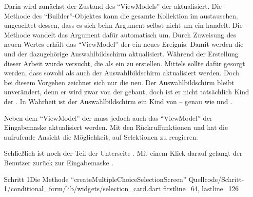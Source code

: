 Darin wird zunächst der Zustand des \enquote{ViewModels} der  aktualisiert.
Die -Methode des \enquote{Builder}-Objektes kann die gesamte Kollektion im  austauschen, ungeachtet dessen, dass es sich beim Argument selbst nicht um ein  handelt.
Die -Methode wandelt das Argument dafür automatisch um.
Durch Zuweisung des neuen Wertes erhält das \enquote{ViewModel} der  ein neues Ereignis.
Damit werden die  und der dazugehörige Auswahlbildschirm aktualisiert.
Während der Erstellung dieser Arbeit wurde versucht, die  als ein  zu erstellen.
Mittels  sollte dafür gesorgt werden, dass sowohl  als auch der Auswahlbildschirm aktualisiert werden.
Doch bei diesem Vorgehen zeichnet sich nur die  neu.
Der Auswahlbildschirm bleibt unverändert, denn er wird zwar von der  gebaut, doch ist er nicht tatsächlich Kind der .
In Wahrheit ist der Auswahlbildschirm ein Kind von  -- genau wie  und .

Neben dem \enquote{ViewModel} der  muss jedoch auch das \enquote{ViewModel} der Eingabemaske aktualisiert werden.
Mit den Rückruffunktionen   und   hat die aufrufende Ansicht die Möglichkeit, auf Selektionen zu reagieren.

Schließlich ist noch der  Teil der Unterseite .
Mit einem Klick darauf gelangt der Benutzer zurück zur Eingabemaske .


\begin{alexlisting}{Schritt 1}{Die Methode \enquote{createMultipleChoiceSelectionScreen}}
  {Quellcode/Schritt-1/conditional_form/lib/widgets/selection_card.dart}
  {firstline=64, lastline=126}
  \label{lst:Schritt1FunktionCreateMultipleChoiceSelectionScreen}
\end{alexlisting}
 